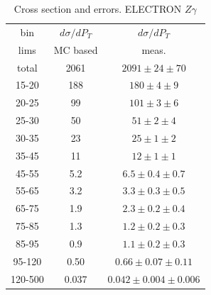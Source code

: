 \begin{table}[h]
  \scriptsize
  \begin{center}
  \caption{Cross section and errors. ELECTRON $Z\gamma$}
  \begin{tabular}{|c|c|c|}
    bin & $d\sigma/dP_{T}$ &$d\sigma/dP_{T}$ \\ 
    lims & MC based &    meas.       \\ \hline
    total & 2061 & $2091 \pm 24 \pm 70$ \\ \hline
    15-20 & 188 & $180 \pm 4 \pm 9$ \\ \hline
    20-25 & 99 & $101 \pm 3 \pm 6$ \\ \hline
    25-30 & 50 & $51 \pm 2 \pm 4$ \\ \hline
    30-35 & 23 & $25 \pm 1 \pm 2$ \\ \hline
    35-45 & 11 & $12 \pm 1 \pm 1$ \\ \hline
    45-55 & 5.2 & $6.5 \pm 0.4 \pm 0.7$ \\ \hline
    55-65 & 3.2 & $3.3 \pm 0.3 \pm 0.5$ \\ \hline
    65-75 & 1.9 & $2.3 \pm 0.2 \pm 0.4$ \\ \hline
    75-85 & 1.3 & $1.2 \pm 0.2 \pm 0.3$ \\ \hline
    85-95 & 0.9 & $1.1 \pm 0.2 \pm 0.3$ \\ \hline
    95-120 & 0.50 & $0.66 \pm 0.07 \pm 0.11$ \\ \hline
    120-500 & 0.037 & $0.042 \pm 0.004 \pm 0.006$ \\ \hline
  \end{tabular}
  \label{tab:sc_mc_vs_meas_ELECTRON_ZGamma}
  \end{center}
\end{table}

